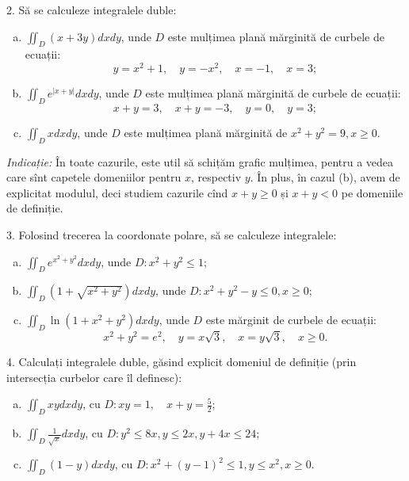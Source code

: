 \documentclass[11pt,a4paper]{article}
\newcommand\ds{\displaystyle}
\theoremstyle{dotless}
\theoremstyle{dotlessdr}
\begin{document}
2. Să se calculeze integralele duble:
\begin{enumerate}[(a)]
\item $\ds\iint_D (x + 3y) dxdy$, unde $D$ este mulțimea plană mărginită de curbele de
  ecuații:
  \[
    y = x^2 + 1, \quad y = -x^2, \quad x = -1, \quad x = 3;
  \]
\item $\ds\iint_D e^{|x + y|} dxdy$, unde $D$ este mulțimea plană mărginită de curbele
  de ecuații:
  \[
    x + y = 3, \quad x + y = -3, \quad y = 0, \quad y = 3;
  \]
\item $\ds\iint_D xdxdy$, unde $D$ este mulțimea plană mărginită de $x^2 + y^2 = 9, x \geq 0$.
\end{enumerate}

\emph{Indicație:} În toate cazurile, este util să schițăm grafic mulțimea, pentru a
vedea care sînt capetele domeniilor pentru $x$, respectiv $y$. În plus, în cazul (b),
avem de explicitat modulul, deci studiem cazurile cînd $x + y \geq 0$ și $x + y < 0$
pe domeniile de definiție.

\vspace{1cm}

3. Folosind trecerea la coordonate polare, să se calculeze integralele:
\begin{enumerate}[(a)]
\item $\ds\iint_D e^{x^2 + y^2} dxdy$, unde $D: x^2 + y^2 \leq 1$;
\item $\ds\iint_D (1 + \sqrt{x^2 + y^2}) dxdy$, unde $D : x^2 + y^2 - y \leq 0, x \geq 0$;
\item $\ds\iint_D \ln(1 + x^2 + y^2) dxdy$, unde $D$ este mărginit de curbele de ecuații:
  \[
    x^2 + y^2 = e^2, \quad y = x\sqrt{3}, \quad x = y \sqrt{3}, \quad x \geq 0.
  \]
\end{enumerate}

\vspace{1cm}

4. Calculați integralele duble, găsind explicit domeniul de definiție (prin intersecția
curbelor care îl definesc):
\begin{enumerate}[(a)]
\item $\ds\iint_D xydxdy$, cu $D: xy = 1, \quad x + y = \frac{5}{2}$;
\item $\ds\iint_D \frac{1}{\sqrt{x}} dxdy$, cu $D: y^2 \leq 8x, y \leq 2x, y + 4x \leq 24$;
\item $\ds\iint_D (1 - y) dxdy$, cu $D: x^2 + (y-1)^2 \leq 1, y \leq x^2, x \geq 0$.
\end{enumerate}
\end{document}
